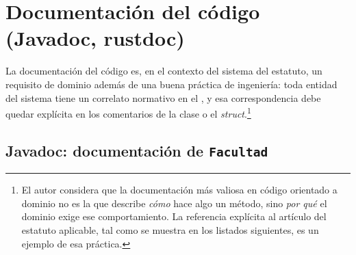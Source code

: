 \section{Documentación del código (Javadoc, rustdoc)}
\label{sec:documentacion}

La documentación del código es, en el contexto del sistema del estatuto, un requisito de
dominio además de una buena práctica de ingeniería: toda entidad del sistema tiene un
correlato normativo en el \acuerdo, y esa correspondencia debe quedar explícita en los
comentarios de la clase o el \textit{struct}.\footnote{El autor considera que la documentación
más valiosa en código orientado a dominio no es la que describe \emph{cómo} hace algo un
método, sino \emph{por qué} el dominio exige ese comportamiento. La referencia explícita
al artículo del estatuto aplicable, tal como se muestra en los listados siguientes, es un
ejemplo de esa práctica.}

\subsection{Javadoc: documentación de \texttt{Facultad}}
\label{subsec:javadoc-facultad}

